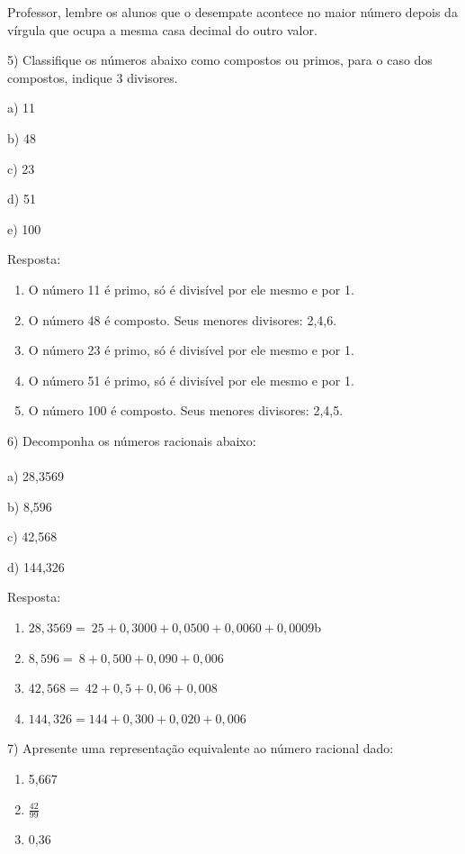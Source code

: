 Professor, lembre os alunos que o desempate acontece no maior número
depois da vírgula que ocupa a mesma casa decimal do outro valor.

5) Classifique os números abaixo como compostos ou primos, para o caso
dos compostos, indique 3 divisores.

a) 11

b) 48

c) 23

d) 51

e) 100

Resposta:

\begin{enumerate}
\def\labelenumi{\alph{enumi})}
\item
  O número 11 é primo, só é divisível por ele mesmo e por 1.
\item
  O número 48 é composto. Seus menores divisores: 2,4,6.
\item
  O número 23 é primo, só é divisível por ele mesmo e por 1.
\item
  O número 51 é primo, só é divisível por ele mesmo e por 1.
\item
  O número 100 é composto. Seus menores divisores: 2,4,5.
\end{enumerate}

6) Decomponha os números racionais abaixo:\\
~\\
a) 28,3569

b) 8,596

c) 42,568

d) 144,326

Resposta:

\begin{enumerate}
\def\labelenumi{\alph{enumi})}
\item
  \(28,3569 = \ 25 + 0,3000 + 0,0500 + 0,0060 + 0,0009\)b
\item
  \(8,596 = \ 8 + 0,500 + 0,090 + 0,006\)
\item
  \(42,568 = \ 42 + 0,5 + 0,06 + 0,008\)
\item
  \(144,326 = 144 + 0,300 + 0,020 + 0,006\)
\end{enumerate}

7) Apresente uma representação equivalente ao número racional dado:

\begin{enumerate}
\def\labelenumi{\alph{enumi})}
\item
  5,667
\item
  \(\frac{42}{99}\)
\item
  0,36
\end{enumerate}

